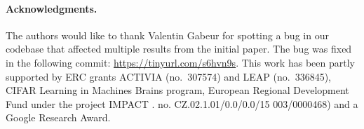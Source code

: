 \documentclass[runningheads]{llncs}
\begin{document}
\paragraph{Acknowledgments.}
The authors would like to thank Valentin Gabeur for spotting a bug in our codebase that affected multiple results from the initial paper.
The bug was fixed in the following commit: \url{https://tinyurl.com/s6hvn9s}.
This work has been partly supported by ERC grants ACTIVIA (no.\
307574) and LEAP (no.\ 336845), CIFAR Learning in Machines  Brains
program, European Regional Development Fund under the project IMPACT \reg. no.
CZ.02.1.01/0.0/0.0/15 003/0000468) and a Google Research Award.
 




\end{document}
